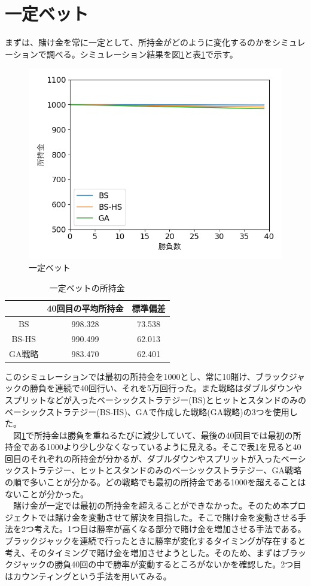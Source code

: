 \section{一定ベット}
まずは、賭け金を常に一定として、所持金がどのように変化するのかをシミュレーションで調べる。シミュレーション結果を図\ref{betdife}と表\ref{bet}で示す。
\begin{figure}[H]
 \begin{center} 
  \includegraphics[width=0.7\linewidth]{./figure/betsimulation-bet-defineite}
  \caption{一定ベット\label{betdife}}
 \end{center}
\end{figure}

\begin{table}[H]
 \caption{一定ベットの所持金\label{bet}}
 \begin{center}
  \begin{tabular}{|c|c|c|}
  \hline  & 40回目の平均所持金 & 標準偏差 \\
  \hline BS & 998.328 & 73.538\\
  \hline BS-HS & 990.499 & 62.013 \\
  \hline GA戦略 & 983.470 & 62.401\\
  \hline
  \end{tabular}
 \end{center}
\end{table}
このシミュレーションでは最初の所持金を1000とし、常に10賭け、ブラックジャックの勝負を連続で40回行い、それを5万回行った。また戦略はダブルダウンやスプリットなどが入ったベーシックストラテジー(BS)とヒットとスタンドのみのベーシックストラテジー(BS-HS)、GAで作成した戦略(GA戦略)の3つを使用した。\\
　図\ref{betdife}で所持金は勝負を重ねるたびに減少していて、最後の40回目では最初の所持金である1000より少し少なくなっているように見える。そこで表\ref{bet}を見ると40回目のそれぞれの所持金が分かるが、ダブルダウンやスプリットが入ったベーシックストラテジー、ヒットとスタンドのみのベーシックストラテジー、GA戦略の順で多いことが分かる。どの戦略でも最初の所持金である1000を超えることはないことが分かった。\\
　賭け金が一定では最初の所持金を超えることができなかった。そのため本プロジェクトでは賭け金を変動させて解決を目指した。そこで賭け金を変動させる手法を2つ考えた。1つ目は勝率が高くなる部分で賭け金を増加させる手法である。ブラックジャックを連続で行ったときに勝率が変化するタイミングが存在すると考え、そのタイミングで賭け金を増加させようとした。そのため、まずはブラックジャックの勝負40回の中で勝率が変動するところがないかを確認した。2つ目はカウンティングという手法を用いてみる。

